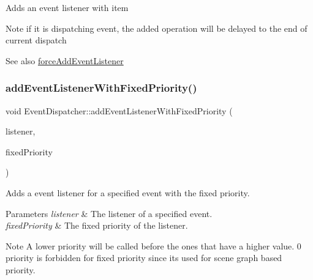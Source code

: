 Adds an event listener with item \begin{DoxyNote}{Note}
if it is dispatching event, the added operation will be delayed to the end of current dispatch 
\end{DoxyNote}
\begin{DoxySeeAlso}{See also}
\hyperlink{classEventDispatcher_aaf736dd2a383a114e59be39e967fb0f3}{force\+Add\+Event\+Listener} 
\end{DoxySeeAlso}
\mbox{\label{classEventDispatcher_a8a874f85b82c33d52a654289d6146bfb}} 
\subsubsection{\texorpdfstring{add\+Event\+Listener\+With\+Fixed\+Priority()}{addEventListenerWithFixedPriority()}\hspace{0.1cm}{\footnotesize\ttfamily [1/2]}}
{\footnotesize\ttfamily void Event\+Dispatcher\+::add\+Event\+Listener\+With\+Fixed\+Priority (\begin{DoxyParamCaption}\item[{\hyperlink{classEventListener}{Event\+Listener} $\ast$}]{listener,  }\item[{int}]{fixed\+Priority }\end{DoxyParamCaption})}

Adds a event listener for a specified event with the fixed priority. 
\begin{DoxyParams}{Parameters}
{\em listener} & The listener of a specified event. \\
\hline
{\em fixed\+Priority} & The fixed priority of the listener. \\
\hline
\end{DoxyParams}
\begin{DoxyNote}{Note}
A lower priority will be called before the ones that have a higher value. 0 priority is forbidden for fixed priority since it\textquotesingle{}s used for scene graph based priority. 
\end{DoxyNote}
\mbox{\label{classEventDispatcher_a8a874f85b82c33d52a654289d6146bfb}} 

